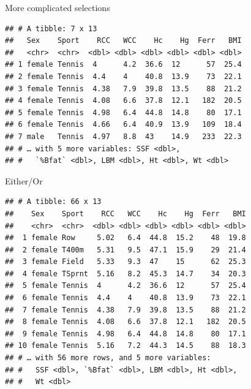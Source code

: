 \documentclass[
  ignorenonframetext,
]{beamer}
\newenvironment{Shaded}{\begin{snugshade}}{\end{snugshade}}
\newcommand{\DecValTok}[1]{\textcolor[rgb]{0.00,0.00,0.81}{#1}}
\newcommand{\KeywordTok}[1]{\textcolor[rgb]{0.13,0.29,0.53}{\textbf{#1}}}
\newcommand{\NormalTok}[1]{#1}
\newcommand{\OperatorTok}[1]{\textcolor[rgb]{0.81,0.36,0.00}{\textbf{#1}}}
\newcommand{\StringTok}[1]{\textcolor[rgb]{0.31,0.60,0.02}{#1}}
\begin{document}
\begin{frame}[fragile]{More complicated selections}
\protect\hypertarget{more-complicated-selections}{}

\begin{Shaded}
\end{Shaded}

\begin{verbatim}
## # A tibble: 7 x 13
##   Sex    Sport    RCC   WCC    Hc    Hg  Ferr   BMI
##   <chr>  <chr>  <dbl> <dbl> <dbl> <dbl> <dbl> <dbl>
## 1 female Tennis  4      4.2  36.6  12      57  25.4
## 2 female Tennis  4.4    4    40.8  13.9    73  22.1
## 3 female Tennis  4.38   7.9  39.8  13.5    88  21.2
## 4 female Tennis  4.08   6.6  37.8  12.1   182  20.5
## 5 female Tennis  4.98   6.4  44.8  14.8    80  17.1
## 6 female Tennis  4.66   6.4  40.9  13.9   109  18.4
## 7 male   Tennis  4.97   8.8  43    14.9   233  22.3
## # … with 5 more variables: SSF <dbl>,
## #   `%Bfat` <dbl>, LBM <dbl>, Ht <dbl>, Wt <dbl>
\end{verbatim}

\end{frame}

\begin{frame}[fragile]{Either/Or}
\protect\hypertarget{eitheror}{}

\begin{Shaded}
\end{Shaded}

\begin{verbatim}
## # A tibble: 66 x 13
##    Sex    Sport    RCC   WCC    Hc    Hg  Ferr   BMI
##    <chr>  <chr>  <dbl> <dbl> <dbl> <dbl> <dbl> <dbl>
##  1 female Row     5.02   6.4  44.8  15.2    48  19.8
##  2 female T400m   5.31   9.5  47.1  15.9    29  21.4
##  3 female Field   5.33   9.3  47    15      62  25.3
##  4 female TSprnt  5.16   8.2  45.3  14.7    34  20.3
##  5 female Tennis  4      4.2  36.6  12      57  25.4
##  6 female Tennis  4.4    4    40.8  13.9    73  22.1
##  7 female Tennis  4.38   7.9  39.8  13.5    88  21.2
##  8 female Tennis  4.08   6.6  37.8  12.1   182  20.5
##  9 female Tennis  4.98   6.4  44.8  14.8    80  17.1
## 10 female Tennis  5.16   7.2  44.3  14.5    88  18.3
## # … with 56 more rows, and 5 more variables:
## #   SSF <dbl>, `%Bfat` <dbl>, LBM <dbl>, Ht <dbl>,
## #   Wt <dbl>
\end{verbatim}

\end{frame}
\end{document}
